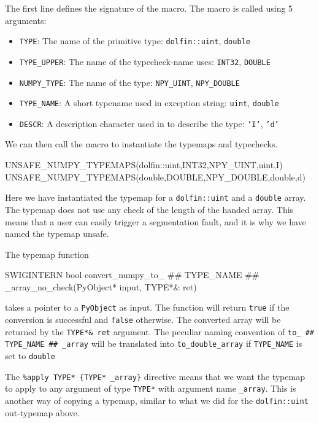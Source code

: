 The first line defines the signature of the macro. The macro is called using 5 arguments:
\begin{itemize}
\item \texttt{TYPE}: The name of the primitive type: \texttt{dolfin::uint}, \texttt{double}
\item \texttt{TYPE\_UPPER}: The name of the typecheck-name \swig uses: \texttt{INT32}, \texttt{DOUBLE}
\item \texttt{NUMPY\_TYPE}: The name of the \numpy type: \texttt{NPY\_UINT}, \texttt{NPY\_DOUBLE}
\item \texttt{TYPE\_NAME}: A short typename used in exception string: \texttt{uint}, \texttt{double}
\item \texttt{DESCR}: A description character used in \numpy to describe the type: \texttt{'I'}, \texttt{'d'}
\end{itemize}
We can then call the macro to instantiate the typemaps and typechecks.
\begin{c++}
UNSAFE_NUMPY_TYPEMAPS(dolfin::uint,INT32,NPY_UINT,uint,I)
UNSAFE_NUMPY_TYPEMAPS(double,DOUBLE,NPY_DOUBLE,double,d)
\end{c++}
Here we have instantiated the typemap for a \texttt{dolfin::uint} and a \texttt{double} array. The typemap does not use any check of the length of the handed \numpy array. This means that a user can easily trigger a segmentation fault, and it is why we have named the typemap unsafe.\par

The typemap function
\begin{c++}
  SWIGINTERN bool convert_numpy_to_ ## TYPE_NAME ## _array_no_check(PyObject* input, TYPE*& ret)
\end{c++}
takes a pointer to a \texttt{PyObject} as input. The function will return \texttt{true} if the conversion is successful and \texttt{false} otherwise. The converted array will be returned by the \texttt{TYPE*\& ret} argument. The peculiar naming convention of \texttt{to\_ \#\# TYPE\_NAME \#\# \_array} will be translated into \texttt{to\_double\_array} if \texttt{TYPE\_NAME} is set to \texttt{double}\par

The \texttt{\%apply TYPE* \{TYPE* \_array\}} directive means that we want the typemap to apply to any argument of type \texttt{TYPE*} with argument name \texttt{\_array}. This is another way of copying a typemap, similar to what we did for the \texttt{dolfin::uint} out-typemap above.\par

